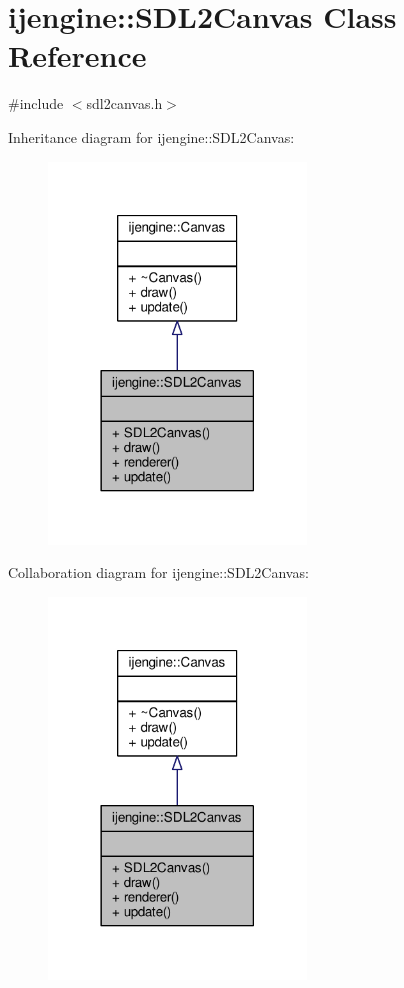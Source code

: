 \hypertarget{classijengine_1_1SDL2Canvas}{\section{ijengine\-:\-:S\-D\-L2\-Canvas Class Reference}
\label{classijengine_1_1SDL2Canvas}
}


{\ttfamily \#include $<$sdl2canvas.\-h$>$}



Inheritance diagram for ijengine\-:\-:S\-D\-L2\-Canvas\-:\nopagebreak
\begin{figure}[H]
\begin{center}
\leavevmode
\includegraphics[width=194pt]{classijengine_1_1SDL2Canvas__inherit__graph}
\end{center}
\end{figure}


Collaboration diagram for ijengine\-:\-:S\-D\-L2\-Canvas\-:\nopagebreak
\begin{figure}[H]
\begin{center}
\leavevmode
\includegraphics[width=194pt]{classijengine_1_1SDL2Canvas__coll__graph}
\end{center}
\end{figure}
